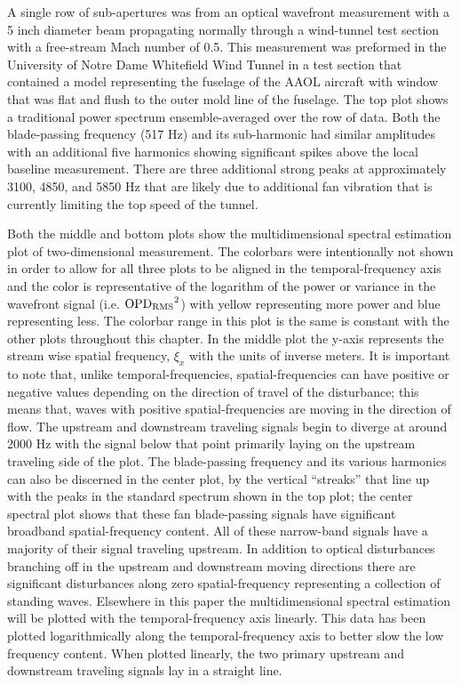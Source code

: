 A single row of sub-apertures was from an optical wavefront measurement with a 5 inch diameter beam propagating normally through a wind-tunnel test section with a free-stream Mach number of 0.5.
This measurement was preformed in the University of Notre Dame Whitefield Wind Tunnel in a test section that contained a model representing the fuselage of the AAOL aircraft \cite{Jumper-2013-8KtN3pue} with window that was flat and flush to the outer mold line of the fuselage.
The top plot shows a traditional power spectrum ensemble-averaged over the row of data.
Both the blade-passing frequency (517 Hz) and its sub-harmonic had similar amplitudes  with an additional five harmonics showing significant spikes above the local baseline measurement.
There are three additional strong peaks at approximately 3100, 4850, and 5850 Hz that are likely due to additional fan vibration that is currently limiting the top speed of the tunnel.

Both the middle and bottom plots show the multidimensional spectral estimation plot of  two-dimensional measurement.
The colorbars were intentionally not shown in order to allow for all three plots to be aligned in the temporal-frequency axis and the color is representative of the logarithm of the power or variance in the wavefront signal (i.e. $\operatorname{OPD_{RMS}}^2$) with yellow representing more power and blue representing less.
The colorbar range in this plot is the same is constant with the other plots throughout this chapter.
In the middle plot the y-axis represents the stream wise spatial frequency, $\xi_x$ with the units of inverse meters.
It is important to note that, unlike temporal-frequencies, spatial-frequencies can have positive or negative values depending on the direction of travel of the disturbance; this means that, waves with positive spatial-frequencies are moving in the direction of flow.
The upstream and downstream traveling signals begin to diverge at around 2000 Hz with the signal below that point primarily laying on the upstream traveling side of the plot.
The blade-passing frequency and its various harmonics can also be discerned in the center plot, by the vertical ``streaks'' that line up  with the peaks in the standard spectrum shown in the top plot; the center spectral plot shows that these fan blade-passing signals have significant broadband spatial-frequency content.
All of these narrow-band signals have a majority of their signal traveling upstream.
In addition to optical disturbances branching off in the upstream and downstream moving directions there are significant disturbances along zero spatial-frequency representing a collection of standing waves.
Elsewhere in this paper the multidimensional spectral estimation will be plotted with the temporal-frequency axis linearly.
This data has been plotted logarithmically along the temporal-frequency axis to better slow the low frequency content.
When plotted linearly, the two primary upstream and downstream traveling signals lay in a straight line.

